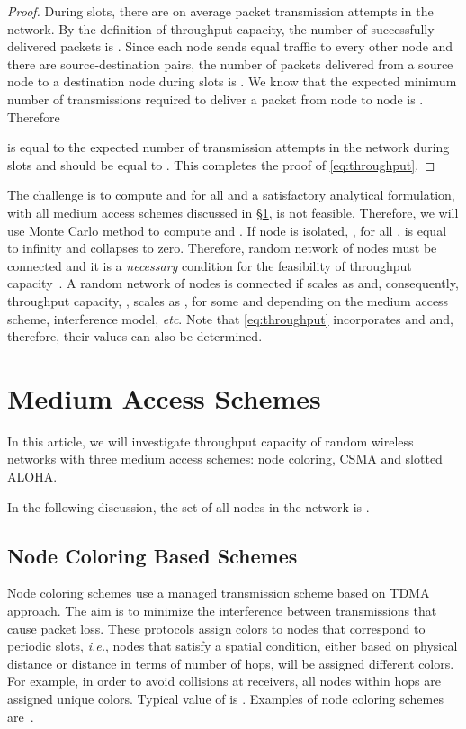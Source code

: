 \documentclass[12pt,english]{article}
\begin{document}
\begin{proof}
During  slots, there are on average  packet transmission attempts in the network. By the definition of throughput capacity, the number of successfully delivered packets is . Since each node sends equal traffic to every other node and there are  source-destination pairs, the number of packets delivered from a source node  to a destination node  during  slots is . We know that the expected minimum number of transmissions required to deliver a packet from node  to node  is . Therefore 

is equal to the expected number of transmission attempts in the network during  slots and should be equal to . This completes the proof of \eqref{eq:throughput}.
\end{proof}

The challenge is to compute  and  for all  and a satisfactory analytical formulation, with all medium access schemes  discussed in \S \ref{sec:models}, is not feasible. Therefore, we will use Monte Carlo method to compute  and . If node  is isolated, , for all , is equal to infinity and  collapses to zero. Therefore, random network of  nodes must be connected and it is a {\em necessary} condition for the feasibility of throughput capacity~\cite{Gupta:Kumar}. A random network of  nodes is connected if  scales as  and, consequently, throughput capacity, , scales as , for some \mbox{} and \mbox{} depending on the medium access scheme, interference model, {\it etc}. Note that \eqref{eq:throughput} incorporates  and  and, therefore, their values can also be determined. 

\section{Medium Access Schemes}
\label{sec:models}

In this article, we will investigate throughput capacity of random wireless networks with three medium access schemes: node coloring, CSMA and slotted ALOHA. 

In the following discussion, the set of all nodes in the network is .

\subsection{Node Coloring Based Schemes}
\label{sec:tdma}

Node coloring schemes use a managed transmission scheme based on TDMA approach. The aim is to minimize the interference between transmissions that cause packet loss. These protocols assign colors to nodes that correspond to periodic slots, {\it i.e.}, nodes that satisfy a spatial condition, either based on physical distance or distance in terms of number of hops, will be assigned different colors. For example, in order to avoid collisions at receivers, all nodes within  hops are assigned unique colors. Typical value of   is . Examples of node coloring schemes are~\cite{unified,SEEDEX,FPRP,DRAND}. 
\end{document}
